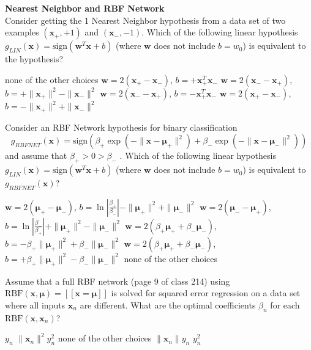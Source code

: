 \documentclass[a4paper,10pt]{exam}
\begin{document}
\begin{questions}
		\question \textbf{Nearest Neighbor and RBF Network}\\
		Consider getting the 1 Nearest Neighbor hypothesis from a data set of two examples $(\mathbf{x}_+, +1)$ and $(\mathbf{x}_-, -1)$. Which of the following linear hypothesis $g_{LIN}(\mathbf{x}) = \mbox{sign}(\mathbf{w}^T \mathbf{x} + b)$ (where $\mathbf{w}$ does not include $b = w_0$) is equivalent to the hypothesis?
		\begin{choices}
			\choice none of the other choices
			\choice $\mathbf{w} = 2 (\mathbf{x}_+ - \mathbf{x}_-)$, $b = + \mathbf{x}_+^T \mathbf{x}_-$
			\choice $\mathbf{w} = 2 (\mathbf{x}_- - \mathbf{x}_+)$, $b = + \|\mathbf{x}_+\|^2 - \|\mathbf{x}_-\|^2$
			\choice $\mathbf{w} = 2 (\mathbf{x}_- - \mathbf{x}_+)$, $b = -\mathbf{x}_+^T \mathbf{x}_-$
			\CorrectChoice $\mathbf{w} = 2 (\mathbf{x}_+ - \mathbf{x}_-)$, $b = - \|\mathbf{x}_+\|^2 + \|\mathbf{x}_-\|^2$\\
		\end{choices}
		
		\question Consider an RBF Network hypothesis for binary classification 
		\[g_{RBFNET}(\mathbf{x}) = \mbox{sign}\left(\beta_+ \exp(-\|\mathbf{x} - {\boldsymbol\mu}_+\|^2) + \beta_- \exp(-\|\mathbf{x} - {\boldsymbol\mu}_-\|^2)\right)\]
		and assume that $\beta_+ > 0 > \beta_-$ . Which of the following linear hypothesis $g_{LIN}(\mathbf{x}) = \mbox{sign}(\mathbf{w}^T \mathbf{x} + b)$ (where $\mathbf{w}$ does not include $b = w_0$) is equivalent to $g_{RBFNET}(\mathbf{x})$?
		\begin{choices}
			\CorrectChoice $\mathbf{w} = 2 ({\boldsymbol\mu}_+ - {\boldsymbol\mu}_-)$, $b = \ln \left|\frac{\beta_+}{\beta_-}\right| - \|{\boldsymbol\mu}_+\|^2 + \|{\boldsymbol\mu}_-\|^2$
			\choice $\mathbf{w} = 2 ({\boldsymbol\mu}_- - {\boldsymbol\mu}_+)$, $b = \ln \left|\frac{\beta_-}{\beta_+}\right| + \|{\boldsymbol\mu}_+\|^2 - \|{\boldsymbol\mu}_-\|^2$
			\choice $\mathbf{w} = 2 (\beta_+ {\boldsymbol\mu}_+ + \beta_- {\boldsymbol\mu}_-)$, $b = - \beta_+\|{\boldsymbol\mu}_+\|^2 + \beta_- \|{\boldsymbol\mu}_-\|^2$
			\choice $\mathbf{w} = 2 (\beta_+ {\boldsymbol\mu}_+ + \beta_- {\boldsymbol\mu}_-)$, $b = + \beta_+\|{\boldsymbol\mu}_+\|^2 - \beta_- \|{\boldsymbol\mu}_-\|^2$
			\choice none of the other choices\\
	   \end{choices}
	   
	   \question Assume that a full RBF network (page 9 of class 214) using $\mbox{RBF}(\mathbf{x}, {\boldsymbol\mu}) = [[\mathbf{x} = {    \boldsymbol\mu}]]$ is solved for squared error regression on a data set where all inputs $\mathbf{x}_n$ are different. What are the optimal coefficients $\beta_n$ for each $\mbox{RBF}(\mathbf{x}, \mathbf{x}_n)$?
	   \begin{choices}
	   	 \CorrectChoice $y_n$
	   	 \choice $\|\mathbf{x}_n\|^2 y_n^2$
	   	 \choice none of the other choices
	   	 \choice $\|\mathbf{x}_n\| y_n$
	   	 \choice $y_n^2$\\
	   \end{choices}
		

\end{questions}
\end{document}
